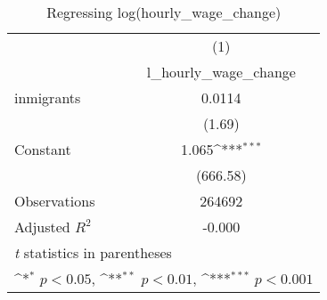 \begin{table}[htbp]\centering
\def\sym#1{\ifmmode^{#1}\else\(^{#1}\)\fi}
\caption{Regressing log(hourly\_wage\_change)}
\begin{tabular}{l*{1}{c}}
\hline\hline
                    &\multicolumn{1}{c}{(1)}\\
                    &\multicolumn{1}{c}{l\_hourly\_wage\_change}\\
\hline
inmigrants          &      0.0114         \\
                    &      (1.69)         \\
[1em]
Constant            &       1.065\sym{***}\\
                    &    (666.58)         \\
\hline
Observations        &      264692         \\
Adjusted \(R^{2}\)  &      -0.000         \\
\hline\hline
\multicolumn{2}{l}{\footnotesize \textit{t} statistics in parentheses}\\
\multicolumn{2}{l}{\footnotesize \sym{*} \(p<0.05\), \sym{**} \(p<0.01\), \sym{***} \(p<0.001\)}\\
\end{tabular}
\end{table}
